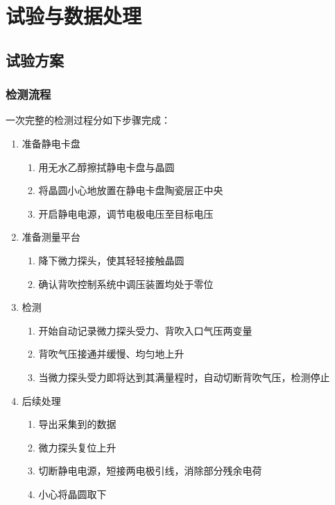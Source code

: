 \chapter{试验与数据处理}\label{ch:exp}




\section{试验方案}


\subsection{检测流程}\label{sec:rig-overall-proc}

一次完整的检测过程分如下步骤完成：

\begin{enumerate}
  \item 准备静电卡盘
  \begin{enumerate}
    \item 用无水乙醇擦拭静电卡盘与晶圆
    \item 将晶圆小心地放置在静电卡盘陶瓷层正中央
    \item 开启静电电源，调节电极电压至目标电压
  \end{enumerate}
  
  \item 准备测量平台
  \begin{enumerate}
    \item 降下微力探头，使其轻轻接触晶圆
    \item 确认背吹控制系统中调压装置均处于零位
  \end{enumerate}
  
  \item 检测
  \begin{enumerate}
    \item 开始自动记录微力探头受力、背吹入口气压两变量
    \item 背吹气压接通并缓慢、均匀地上升
    \item 当微力探头受力即将达到其满量程时，自动切断背吹气压，检测停止
  \end{enumerate}
  
  \item 后续处理
  \begin{enumerate}
    \item 导出采集到的数据
    \item 微力探头复位上升
    \item 切断静电电源，短接两电极引线，消除部分残余电荷
    \item 小心将晶圆取下
  \end{enumerate}
\end{enumerate}